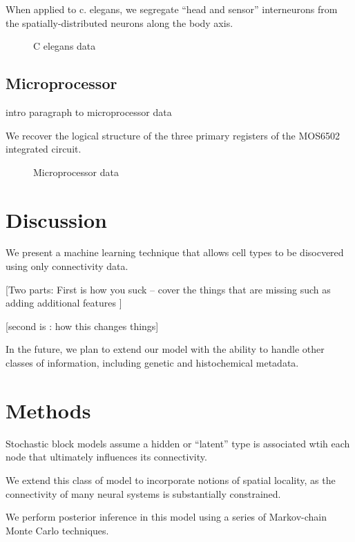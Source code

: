 \documentclass{article}
\begin{document}
When applied to c. elegans, we segregate ``head and sensor'' interneurons from the spatially-distributed neurons along the body axis. 


\begin{figure}
  \centering 
  \caption{C elegans data}
\end{figure}

\subsection{Microprocessor}
intro paragraph to microprocessor data 

We recover the logical structure of the three primary registers of the
MOS6502 integrated circuit.

\begin{figure}
  \centering 
  \caption{Microprocessor data}
\end{figure}


\section{Discussion}
We present a machine learning technique that allows cell types to be
disocvered using only connectivity data. 

[Two parts: First is how you suck -- cover the things that are missing
such as adding additional features ]

[second is : how this changes things]

In the future, we plan to extend our model with the ability to handle
other classes of information, including genetic and histochemical
metadata.


\section{Methods}
Stochastic block models assume a hidden or ``latent'' type is associated
wtih each node that ultimately influences its connectivity. 

We extend this class of model to incorporate notions of spatial locality, 
as the connectivity of many neural systems is substantially constrained. 

We perform posterior inference in this model using a series of Markov-chain
Monte Carlo techniques. 
\end{document}

